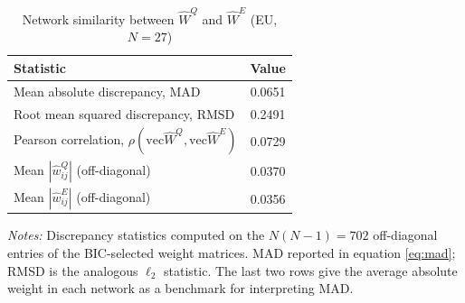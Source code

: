 \begin{table}[H]\centering
\caption{Network similarity between $\hat W^Q$ and $\hat W^E$ (EU, $N = 27$)}
\label{tab:similarity}
\begin{tabular}{lc}\hline\hline
Statistic & Value \\\hline
Mean absolute discrepancy, $\mathrm{MAD}$ & 0.0651 \\
Root mean squared discrepancy, $\mathrm{RMSD}$ & 0.2491 \\
Pearson correlation, $\rho(\mathrm{vec}\hat W^Q, \mathrm{vec}\hat W^E)$ & 0.0729 \\
\hline
Mean $|\hat w^Q_{ij}|$ (off-diagonal) & 0.0370 \\
Mean $|\hat w^E_{ij}|$ (off-diagonal) & 0.0356 \\
\hline\hline\end{tabular}
\parbox{\textwidth}{\footnotesize \textit{Notes:} Discrepancy statistics computed on the $N(N-1) = 702$ off-diagonal entries of the BIC-selected weight matrices. MAD reported in equation \eqref{eq:mad}; RMSD is the analogous $\ell_2$ statistic. The last two rows give the average absolute weight in each network as a benchmark for interpreting MAD.}
\end{table}
